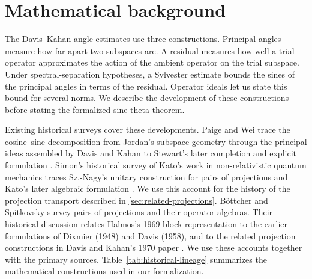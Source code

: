 \documentclass[pdflatex]{sn-jnl} %
\theoremstyle{thmstyleone}
\begin{document}
\section{Mathematical background}
\label{sec:related}

The Davis--Kahan angle estimates use three constructions. Principal angles
measure how far apart two subspaces are. A residual measures
how well a trial operator approximates the action of the ambient operator
on the trial subspace. Under spectral-separation hypotheses, a Sylvester
estimate bounds the sines of the principal angles in terms of the residual.
Operator ideals let us state this bound for several norms. We describe the
development of these constructions before stating the formalized sine-theta theorem.

Existing historical surveys cover these developments. Paige and Wei trace
the cosine--sine decomposition from Jordan's subspace geometry through the
principal ideas assembled by Davis and Kahan to Stewart's later completion
and explicit formulation \citep{paige1994history}.
Simon's historical survey of Kato's work in non-relativistic quantum mechanics
traces Sz.-Nagy's unitary construction for pairs of projections and Kato's
later algebraic formulation \citep[\S5]{simon2018kato}.
We use this account for the history of the projection transport described in
\cref{sec:related-projections}.
B\"ottcher and Spitkovsky survey pairs of projections and their operator algebras.
Their historical discussion relates Halmos's 1969 block representation to the
earlier formulations of Dixmier (1948) and Davis (1958), and to the related
projection constructions in Davis and Kahan's 1970 paper
\citep[Remark~1.3]{bottcher2010gentle}.
We use these accounts together with the primary
sources. Table~\ref{tab:historical-lineage} summarizes the mathematical
constructions used in our formalization.
\end{document}
